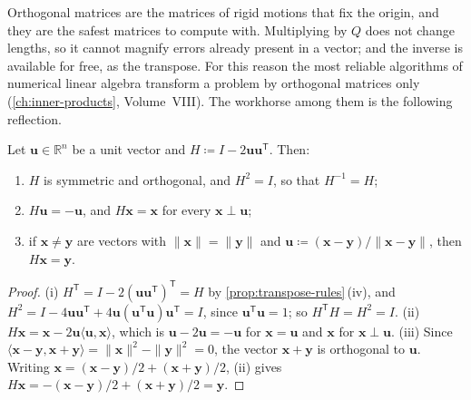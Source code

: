 Orthogonal matrices are the matrices of rigid motions that fix the origin, and they are the safest matrices to compute with. Multiplying by $Q$ does not change lengths, so it cannot magnify errors already present in a vector; and the inverse is available for free, as the transpose. For this reason the most reliable algorithms of numerical linear algebra transform a problem by orthogonal matrices only (\cref{ch:inner-products}, Volume~VIII). The workhorse among them is the following reflection.

\begin{proposition}
\label{prop:householder}
Let $\mathbf u\in\mathbb R^n$ be a unit vector and $H\coloneqq I-2\mathbf u\mathbf u^{\mathsf T}$. Then:
\begin{enumerate}
\item $H$ is symmetric and orthogonal, and $H^2=I$, so that $H^{-1}=H$;
\item $H\mathbf u=-\mathbf u$, and $H\mathbf x=\mathbf x$ for every $\mathbf x\perp\mathbf u$;
\item if $\mathbf x\ne\mathbf y$ are vectors with $\|\mathbf x\|=\|\mathbf y\|$ and $\mathbf u\coloneqq(\mathbf x-\mathbf y)/\|\mathbf x-\mathbf y\|$, then $H\mathbf x=\mathbf y$.
\end{enumerate}
\end{proposition}

\begin{proof}
(i) $H^{\mathsf T}=I-2(\mathbf u\mathbf u^{\mathsf T})^{\mathsf T}=H$ by \cref{prop:transpose-rules}\,(iv), and $H^2=I-4\mathbf u\mathbf u^{\mathsf T}+4\mathbf u(\mathbf u^{\mathsf T}\mathbf u)\mathbf u^{\mathsf T}=I$, since $\mathbf u^{\mathsf T}\mathbf u=1$; so $H^{\mathsf T}H=H^2=I$. (ii) $H\mathbf x=\mathbf x-2\mathbf u\langle\mathbf u,\mathbf x\rangle$, which is $\mathbf u-2\mathbf u=-\mathbf u$ for $\mathbf x=\mathbf u$ and $\mathbf x$ for $\mathbf x\perp\mathbf u$. (iii) Since $\langle\mathbf x-\mathbf y,\mathbf x+\mathbf y\rangle=\|\mathbf x\|^2-\|\mathbf y\|^2=0$, the vector $\mathbf x+\mathbf y$ is orthogonal to $\mathbf u$. Writing $\mathbf x=(\mathbf x-\mathbf y)/2+(\mathbf x+\mathbf y)/2$, (ii) gives $H\mathbf x=-(\mathbf x-\mathbf y)/2+(\mathbf x+\mathbf y)/2=\mathbf y$.
\end{proof}

